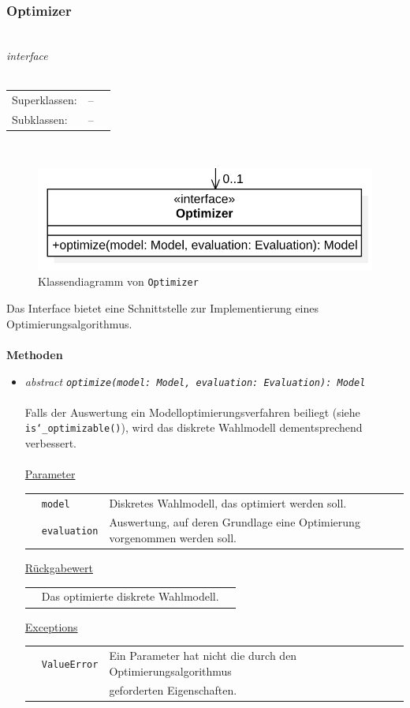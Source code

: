 \documentclass{article}
\begin{document}
\subsubsection*{\large{\textbf{Optimizer}\label{cls:Optimizer}}}\\
\textit{\flqq{}interface\frqq}\normalsize\\\\
\begin{tabular}{lll}
 Superklassen: & --\\
 Subklassen: & --
\end{tabular}\\
\begin{figure}[H]%
    \centering
    \includegraphics[width=13cm]{entwurf/Entwurf_dokument/img/cls/model/Optimizer.png}
    \caption{Klassendiagramm von \texttt{Optimizer}}
\end{figure}

Das Interface bietet eine Schnittstelle zur Implementierung eines Optimierungsalgorithmus.
\\\\

\textbf{Methoden}
\begin{itemize}\setlength\itemsep{3em}
\item \textit{\flqq{}abstract\frqq} \texttt{\textit{optimize(model: Model, evaluation: Evaluation): Model}}\\\\
Falls der Auswertung ein Modelloptimierungsverfahren beiliegt (siehe \texttt{is\char`_optimizable()}), wird das diskrete Wahlmodell dementsprechend verbessert.\\\\
\underline{Parameter}\\
\begin{tabular}{lll}
 & \texttt{model} & Diskretes Wahlmodell, das optimiert werden soll.\\
 & \texttt{evaluation} & Auswertung, auf deren Grundlage eine Optimierung vorgenommen werden soll.
\end{tabular}

\underline{Rückgabewert}\\
\begin{tabular}{lll}
 & Das optimierte diskrete Wahlmodell.\\
\end{tabular}

\underline{Exceptions}\\
\begin{tabular}{lll}
 & \texttt{ValueError} & Ein Parameter hat nicht die durch den Optimierungsalgorithmus\\
 && geforderten Eigenschaften.\\
\end{tabular}
\end{itemize}
\end{document}
